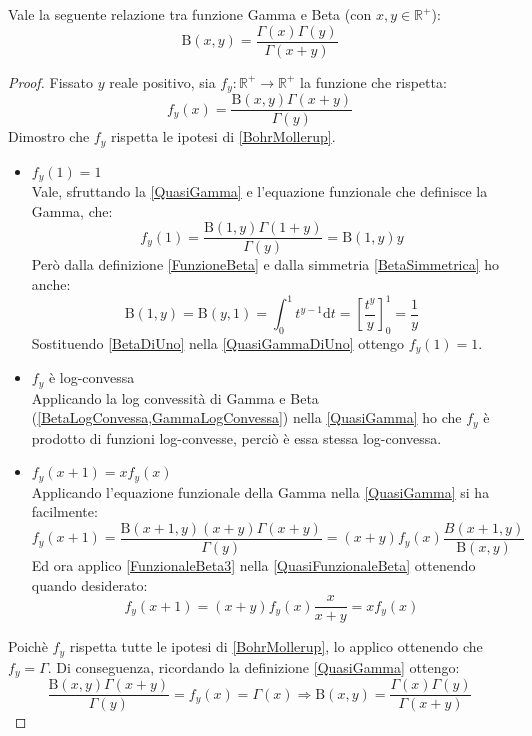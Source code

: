 \begin{theorem}\label{GammaBeta}
	Vale la seguente relazione tra funzione Gamma e Beta (con $x,y\in\mathbb{R}^+$):
	\begin{equation*}
		\mathrm{B}(x,y)=\frac{\Gamma(x)\Gamma(y)}{\Gamma(x+y)}
	\end{equation*}
\end{theorem}
\begin{proof}
	Fissato $y$ reale positivo, sia $f_y:\mathbb{R^+}\to\mathbb{R^+}$ la funzione che rispetta:
	\begin{equation}\label{QuasiGamma}
		f_y(x)=\frac{\mathrm{B}(x,y)\Gamma(x+y)}{\Gamma(y)}
	\end{equation}
	Dimostro che $f_y$ rispetta le ipotesi di \cref{BohrMollerup}.
	\begin{itemize}
		\item $f_y(1)=1$\\
			Vale, sfruttando la \cref{QuasiGamma} e l'equazione funzionale che definisce la Gamma, che:
			\begin{equation}\label{QuasiGammaDiUno}
				f_y(1)=\frac{\mathrm{B}(1,y)\Gamma(1+y)}{\Gamma(y)}=\mathrm{B}(1,y)y
			\end{equation}
			Però dalla definizione \cref{FunzioneBeta} e dalla simmetria \cref{BetaSimmetrica} ho anche:
			\begin{equation}\label{BetaDiUno}
				\mathrm{B}(1,y)=\mathrm{B}(y,1)=\int_0^1 t^{y-1} \mathrm{d}t = \left[\frac{t^y}y\right]_0^1= \frac1y
			\end{equation}
			Sostituendo \cref{BetaDiUno} nella \cref{QuasiGammaDiUno} ottengo $f_y(1)=1$.
		\item $f_y$ è log-convessa\\
			Applicando la log convessità di Gamma e Beta (\cref{BetaLogConvessa,GammaLogConvessa}) nella \cref{QuasiGamma} ho che $f_y$ è prodotto di 
			funzioni log-convesse, perciò è essa stessa log-convessa.
		\item $f_y(x+1)=xf_y(x)$\\
			Applicando l'equazione funzionale della Gamma nella \cref{QuasiGamma} si ha facilmente:
			\begin{equation}\label{QuasiFunzionaleBeta}
				f_y(x+1)=\frac{\mathrm{B}(x+1,y)(x+y)\Gamma(x+y)}{\Gamma(y)}=(x+y) f_y(x) \frac{B(x+1,y)}{\mathrm{B}(x,y)}
			\end{equation}
			Ed ora applico \cref{FunzionaleBeta3} nella \cref{QuasiFunzionaleBeta} ottenendo quando desiderato:
			\begin{equation*}
				f_y(x+1)=(x+y) f_y(x) \frac{x}{x+y}=xf_y(x)
			\end{equation*}
	\end{itemize}
	Poichè $f_y$ rispetta tutte le ipotesi di \cref{BohrMollerup}, lo applico ottenendo che $f_y=\Gamma$.
	Di conseguenza, ricordando la definizione \cref{QuasiGamma} ottengo:
	\begin{equation*}
		\frac{\mathrm{B}(x,y)\Gamma(x+y)}{\Gamma(y)}=f_y(x)=\Gamma(x) \Longrightarrow \mathrm{B}(x,y)=\frac{\Gamma(x)\Gamma(y)}{\Gamma(x+y)}
	\end{equation*}
\end{proof}

